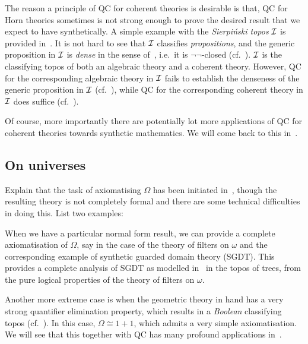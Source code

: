 The reason a principle of \gls{QC} for coherent theories is desirable is that, \gls{QC} for Horn theories sometimes is not strong enough to prove the desired result that we expect to have synthetically. A simple example with the \emph{Sierpi\'nski topos} $\mathcal{I}$ is provided in~. It is not hard to see that $\mathcal{I}$ classifies \emph{propositions}, and the generic proposition in $\mathcal{I}$ is \emph{dense} in the sense of~, i.e.\ it is $\neg\neg$-closed (cf.~). $\mathcal{I}$ is the classifying topos of both an algebraic theory and a coherent theory. However, \gls{QC} for the corresponding algebraic theory in $\mathcal{I}$ fails to establish the denseness of the generic proposition in $\mathcal{I}$ (cf.~), while \gls{QC} for the corresponding coherent theory in $\mathcal{I}$ does suffice (cf.~). 

Of course, more importantly there are potentially lot more applications of \gls{QC} for coherent theories towards synthetic mathematics. We will come back to this in~. 

\subsection{On universes}

Explain that the task of axiomatising $\Omega$ has been initiated in~\citet{blechschmidt_general_2020}, though the resulting theory is not completely formal and there are some technical difficulties in doing this. List two examples: 

When we have a particular normal form result, we can provide a complete axiomatisation of $\Omega$, say in the case of the theory of filters on $\omega$ and the corresponding example of synthetic guarded domain theory (\gls{SGDT}). This provides a complete analysis of \gls{SGDT} as modelled in~\citet{birkedal_first_2012} in the topos of trees, from the pure logical properties of the theory of filters on $\omega$.

Another more extreme case is when the geometric theory in hand has a very strong quantifier elimination property, which results in a \emph{Boolean} classifying topos (cf.~\citet{blass_boolean_1983}). In this case, $\Omega \cong 1 + 1$, which admits a very simple axiomatisation. We will see that this together with \gls{QC} has many profound applications in~.

